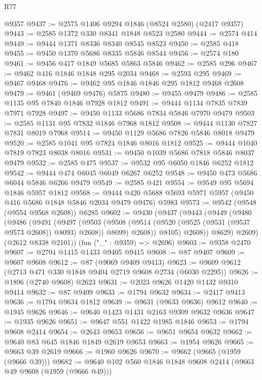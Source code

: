 \begin{lexlean}{R77}
\begin{coremodule}
    @9357
@9437 := @2575 @1406 @9294 @1846 (@8524 @2580) (@2417 @9357)
@9443 := @2585 @1372 @330 @8341 @1848 @8523 @2580
@9444 := @2574 @414
@9449 := @9444 @1371 @8336 @8340 @8545 @8523
@9450 := @2585 @418
@9455 := @9450 @1370 @5686 @8335 @5846 @8544
@9456 := @2574 @180
@9461 := @9456 @417 @1849 @5685 @5863 @5846
@9462 := @2585 @296
@9467 := @9462 @416 @1846 @1848 @295 @2034
@9468 := @2593 @295
@9469 := @9467 @9468
@9476 := @9462 @95 @1846 @1846 @295 @1812 @9468 @2608
@9479 := @9461 (@9469 @9476) @5875
@9480 := @9455 @9479
@9486 := @2585 @1135 @95 @7840 @1846 @7928 @1812
@9491 := @9444 @1134 @7835 @7839 @7971 @7928
@9497 := @9450 @1133 @5686 @7834 @5846 @7970 @9479
@9503 := @2585 @1131 @95 @7832 @1846 @7968 @1812
@9508 := @9444 @1130 @7827 @7831 @8019 @7968
@9514 := @9450 @1129 @5686 @7826 @5846 @8018 @9479
@9520 := @2585 @1041 @95 @7824 @1846 @8016 @1812
@9525 := @9444 @1040 @7819 @7823 @8038 @8016
@9531 := @9450 @1039 @5686 @7818 @5846 @8037 @9479
@9532 := @2585 @475
@9537 := @9532 @95 @6050 @1846 @6252 @1812
@9542 := @9444 @474 @6045 @6049 @6267 @6252
@9548 := @9450 @473 @5686 @6044 @5846 @6266 @9479
@9549 := @2585 @421
@9554 := @9549 @95 @5694 @1846 @5957 @1812
@9568 := @9444 @420 @5688 @5693 @5971 @5957 (@9450 @416 @5686 @1848 @5846 @2034 @9479 @9476) @5983
@9573 := @9542 (@9548 (@9554 @9568 @2608)) @6285
@9602 := @9430
    (@9437
      (@9443
        (@9449
          (@9480
            (@9486
              (@9491
                (@9497
                  (@9503
                    (@9508 (@9514 (@9520 (@9525 (@9531 (@9537 @9573 @2608)) @8093) @2608)) @8099)
                    @2608))
                @8105)
              @2608))
          @8629)
        @2609)
      (@2612 @8338 @2101))
    (fun ("_" : @9359) => @2696)
@9603 := @9358 @2470
@9607 := @2704 @1415 @1433 @9405 @9415
@9608 := @87 @9407
@9609 := @9607 @9608
@9612 := @87 (@9069 @9409 @9413)
@9623 := @9609 @9612 (@2713 @471 @330 @1848 @9404 @2719 @9608 @2734 (@6030 @2295))
@9626 := @1896 (@2740 @9608) @2623
@9631 := @2023 @9626 @1420 @1432 @9310 @9414
@9632 := @87 @9409
@9633 := @1794 @9632
@9634 := @2417 @9413
@9636 := @1794 @9634 @1812
@9639 := @9631 (@9633 @9636) @9612
@9640 := @1945 @9626
@9646 := @9640 @1423 @1431 @2163 @9309 @9632 @9636
@9647 := @1935 @9626
@9651 := @9647 @551 @1422 @1985 @1846
@9653 := @1794 @9608 @2414
@9654 := @2643 @9653
@9656 := @9651 @9654 @9632
@9662 := @9640 @83 @645 @1846 @1849 @2619 @9653
@9663 := @1954 @9626
@9665 := @9663 @39 @2619
@9666 := @1960 @9626
@9670 := @9662 (@9665 (@1959 (@9666 @39)))
@9682 := @9640 @102 @560 @1846 @1848 @9608 @2414 (@9663 @49 @9608 (@1959 (@9666 @49)))

\end{coremodule}
\end{lexlean}
